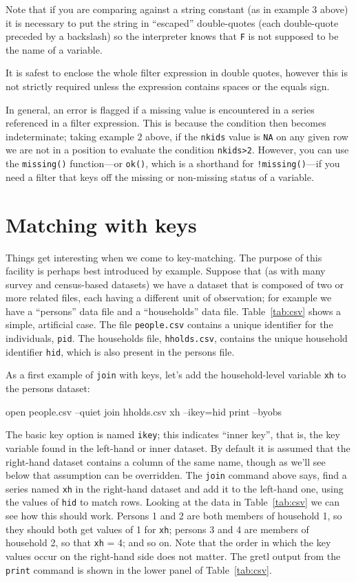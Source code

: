 Note that if you are comparing against a string constant (as in
example 3 above) it is necessary to put the string in ``escaped''
double-quotes (each double-quote preceded by a backslash) so the
interpreter knows that \texttt{F} is not supposed to be the name of a
variable.

It is safest to enclose the whole filter expression in double quotes,
however this is not strictly required unless the expression contains
spaces or the equals sign.

In general, an error is flagged if a missing value is encountered in
a series referenced in a filter expression. This is because the
condition then becomes indeterminate; taking example 2 above, if the
\texttt{nkids} value is \texttt{NA} on any given row we are not in a
position to evaluate the condition \texttt{nkids>2}. However, you can
use the \texttt{missing()} function---or \texttt{ok()}, which is a
shorthand for \texttt{!missing()}---if you need a filter that keys off
the missing or non-missing status of a variable.


\section{Matching with keys}
\label{sec:join-keys}

Things get interesting when we come to key-matching. The purpose of
this facility is perhaps best introduced by example.  Suppose that (as
with many survey and census-based datasets) we have a dataset that is
composed of two or more related files, each having a different unit of
observation; for example we have a ``persons'' data file and a
``households'' data file. Table~\ref{tab:csv} shows a simple,
artificial case. The file \texttt{people.csv} contains a unique
identifier for the individuals, \texttt{pid}. The households file,
\texttt{hholds.csv}, contains the unique household identifier
\texttt{hid}, which is also present in the persons file.

As a first example of \texttt{join} with keys, let's add the
household-level variable \texttt{xh} to the persons dataset:
%
\begin{code}
open people.csv --quiet
join hholds.csv xh --ikey=hid
print --byobs
\end{code}

The basic key option is named \texttt{ikey}; this indicates ``inner
key'', that is, the key variable found in the left-hand or inner
dataset. By default it is assumed that the right-hand dataset contains
a column of the same name, though as we'll see below that assumption
can be overridden. The \texttt{join} command above says, find a series
named \texttt{xh} in the right-hand dataset and add it to the
left-hand one, using the values of \texttt{hid} to match rows.
Looking at the data in Table~\ref{tab:csv} we can see how this should
work. Persons 1 and 2 are both members of household 1, so they should
both get values of 1 for \texttt{xh}; persons 3 and 4 are members of
household 2, so that \texttt{xh} = 4; and so on. Note that the order
in which the key values occur on the right-hand side does not matter.
The gretl output from the \texttt{print} command is shown in the lower
panel of Table~\ref{tab:csv}.

